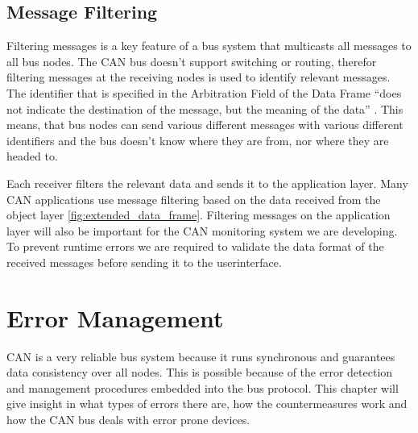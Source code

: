 	\subsection{Message Filtering}
	Filtering messages is a key feature of a bus system that
	multicasts all messages to all bus nodes. The CAN bus doesn't support switching
	or routing, therefor filtering messages at the receiving nodes is used to
	identify relevant messages. The identifier that is specified in the Arbitration
	Field of the Data Frame ``does not indicate the destination of the message, but
	the meaning of the data'' \cite{can2spec}. This means, that bus nodes can send
	various different messages with various different identifiers and the bus doesn't know
	where they are from, nor where they are headed to. 
	
	Each receiver filters the
	relevant data and sends it to the application layer. Many CAN applications use
	message filtering based on the data received from the object
	layer \autoref{fig:extended_data_frame}.
	Filtering messages on the application layer will also be important for the CAN
	monitoring system we are developing. To prevent runtime errors we are required
	to validate the data format of the received messages before sending it to the
	userinterface.
	
		
	\section{Error Management}
	CAN is a very reliable bus system because it runs synchronous and
	guarantees data consistency over all nodes. This is possible because of the
	error detection and management procedures embedded into the bus protocol. This
	chapter will give insight in what types of errors there are, how the
	countermeasures work and how the CAN bus deals with error prone devices.
	
